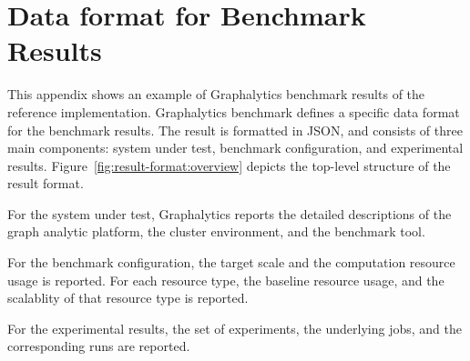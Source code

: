 \chapter{Data format for Benchmark Results}
\label{chap:data-format}

This appendix shows an example of Graphalytics benchmark results of the reference implementation. Graphalytics benchmark defines a specific data format for the benchmark results. The result is formatted in JSON, and consists of three main components: system under test, benchmark configuration, and experimental results. Figure~\ref{fig:result-format:overview} depicts the top-level structure of the result format.



For the system under test, Graphalytics reports the detailed descriptions of the graph analytic platform, the cluster environment, and the benchmark tool.



For the benchmark configuration, the target scale and the computation resource usage is reported. For each resource type, the baseline resource usage, and the scalablity of that resource type is reported.





For the experimental results, the set of experiments, the underlying jobs, and the corresponding runs are reported.
